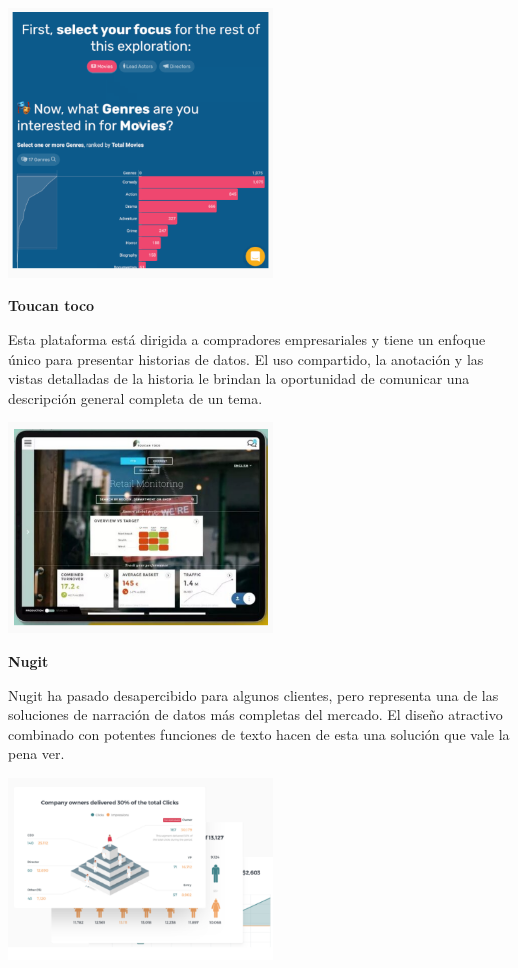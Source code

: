 \documentclass[twoside,twocolumn]{article}
\begin{document}
\includegraphics[width=7cm]{imagenes/img1.png}

\textbf{Toucan toco}

Esta plataforma está dirigida a compradores empresariales y tiene un enfoque único para presentar historias de datos. El uso compartido, la anotación y las vistas detalladas de la historia le brindan la oportunidad de comunicar una descripción general completa de un tema. 

\includegraphics[width=7cm]{imagenes/img2.png}


\textbf{Nugit}


Nugit ha pasado desapercibido para algunos clientes, pero representa una de las soluciones de narración de datos más completas del mercado. El diseño atractivo combinado con potentes funciones de texto hacen de esta una solución que vale la pena ver. 


\includegraphics[width=7cm]{imagenes/img3.png}
\end{document}
